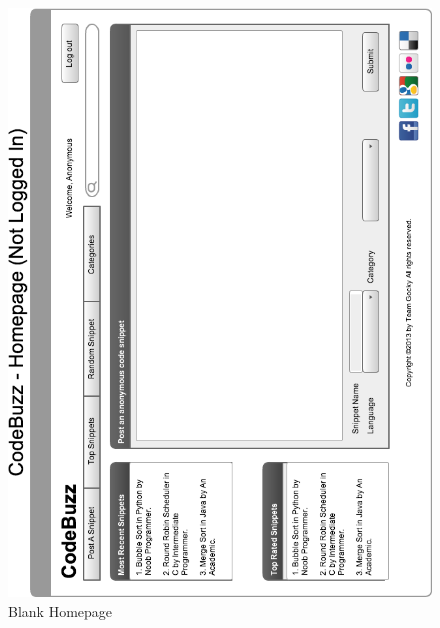 \documentclass{sig-alt-release2}
\begin{document}
\begin{figure}
\includegraphics[width=\textwidth]{../imgs/InitialHomepageHorz.png}
\caption{Blank Homepage}
\label{fig:blankPage}
\end{figure}
\end{document}
